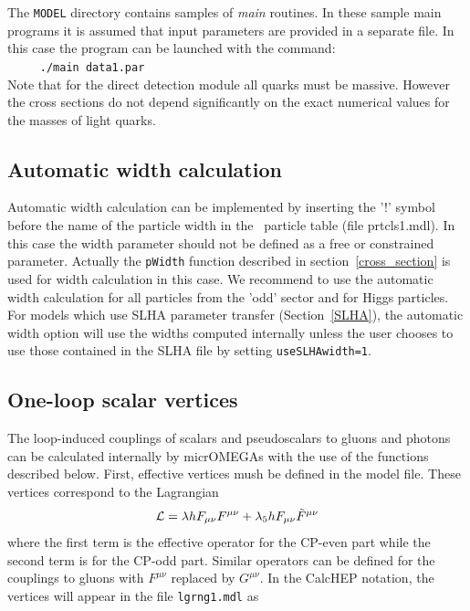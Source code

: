 \documentclass[12pt,a4paper]{article}
\begin{document}
The {\tt MODEL} directory contains  samples of {\it main}
routines. In these sample main programs it is assumed that input parameters are provided in a separate
file. In this case the  program can be launched with the command:\\
\verb|     ./main data1.par|\\
Note that for the direct detection module all quarks must be  massive. 
However the cross sections do not depend significantly on the exact  
numerical values for the masses of light quarks.

 
\subsection{Automatic width calculation}
Automatic width calculation can be 
implemented by  inserting the '!' symbol before the name of the particle width  in 
the \calchep\ particle table (file prtcls1.mdl). In this case the width parameter 
should not be defined as a free or constrained parameter. 
Actually the \verb|pWidth| function  described in section~\ref{cross_section} is  used for width calculation in this case.
We recommend to use the
automatic width calculation for all particles from the 'odd' sector and for
Higgs particles. 
For models which use SLHA parameter transfer (Section~\ref{SLHA}), 
the automatic width option will use the widths computed internally unless the user chooses to use those contained  in the SLHA file  by setting {\tt useSLHAwidth=1}. 

\subsection{One-loop scalar vertices}

The loop-induced  couplings of scalars and pseudoscalars to  gluons and photons can be calculated internally by micrOMEGAs with the use of the functions described below. First, effective vertices mush be defined in the model file. These vertices  correspond to the Lagrangian 
\begin{equation}
{\cal L}= \lambda h F_{\mu\nu} F^{\mu\nu} +\lambda_5 h F_{\mu\nu} \tilde{F}^{\mu\nu}
\label{eq:Leff}
\end{equation}
where the first term is the effective operator for the CP-even part while the second term is for the CP-odd part. Similar operators can be defined for the couplings to gluons with $F^{\mu\nu}$ replaced by $G^{\mu\nu}$. In the CalcHEP notation, the vertices will appear in the file \verb|lgrng1.mdl| as
\end{document}
